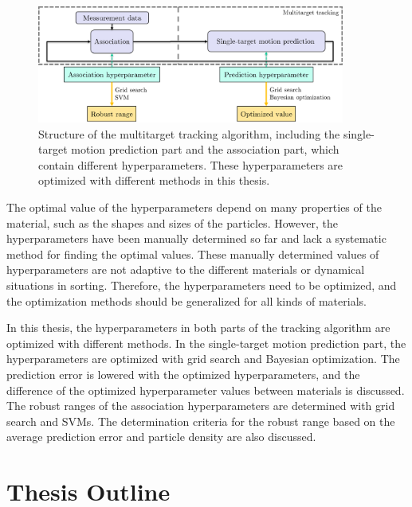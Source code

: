 \begin{figure}[htb]
\centering
\includegraphics[width=0.9\textwidth]{figures/tracking system simple.png}
\caption{Structure of the multitarget tracking algorithm, including the single-target motion prediction part and the association part, which contain different hyperparameters. These hyperparameters are optimized with different methods in this thesis.}
\label{tracking system simple}
\end{figure}

The optimal value of the hyperparameters depend on many properties of the material, such as the shapes and sizes of the particles. However, the hyperparameters have been manually determined so far and lack a systematic method for finding the optimal values. These manually determined values of hyperparameters are not adaptive to the different materials or dynamical situations in sorting. Therefore, the hyperparameters need to be optimized, and the optimization methods should be generalized for all kinds of materials.


In this thesis, the hyperparameters in both parts of the tracking algorithm are optimized with different methods. In the single-target motion prediction part, the hyperparameters are optimized with grid search and Bayesian optimization. The prediction error is lowered with the optimized hyperparameters, and the difference of the optimized hyperparameter values between materials is discussed. The robust ranges of the association hyperparameters are determined with grid search and SVMs. The determination criteria for the robust range based on the average prediction error and particle density are also discussed.

\section{Thesis Outline}


